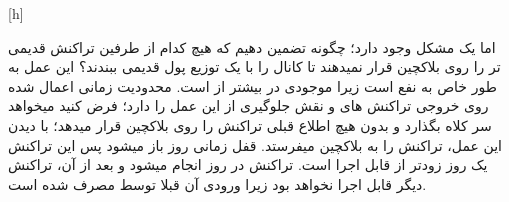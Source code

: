 [h]

اما یک مشکل وجود دارد؛ چگونه تضمین دهیم که هیچ کدام از طرفین تراکنش قدیمی تر  را روی بلاکچین قرار نمیدهند تا کانال را با یک توزیع پول قدیمی ببندند؟ این عمل به طور خاص به نفع  است زیرا موجودی  در  بیشتر از  است. محدودیت زمانی اعمال شده روی خروجی تراکنش های  و  نقش جلوگیری از این عمل را دارد؛ فرض کنید  میخواهد سر  کلاه بگذارد و بدون هیچ اطلاع قبلی تراکنش  را روی بلاکچین قرار میدهد؛  با دیدن این عمل، تراکنش    را به بلاکچین میفرستد. قفل زمانی   روز  باز میشود پس این تراکنش یک روز زودتر از  قابل اجرا است. تراکنش   در روز  انجام میشود و بعد از آن، تراکنش  دیگر قابل اجرا نخواهد بود زیرا ورودی آن قبلا توسط   مصرف شده است.





